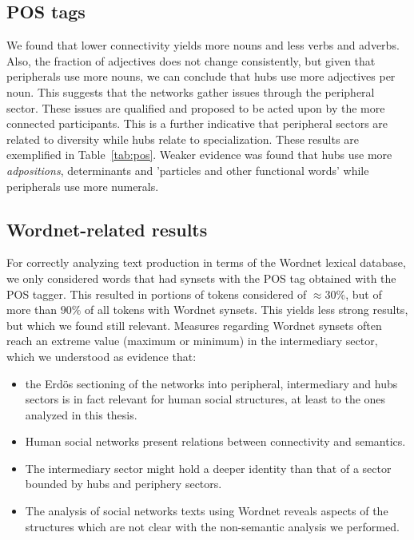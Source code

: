 
\subsection{POS tags}\label{subsec:pos}
We found that lower connectivity yields more nouns and less verbs and adverbs.
Also, the fraction of adjectives does not change consistently,
but given that peripherals use more nouns,
we can conclude that hubs use more adjectives per noun.
This suggests that the networks gather issues
through the peripheral sector. 
These issues are qualified and proposed to be acted upon
by the more connected participants.
This is a further indicative that peripheral sectors
are related to diversity while hubs relate to specialization.
These results are exemplified in Table~\ref{tab:pos}.
Weaker evidence was found that hubs use more \emph{adpositions},
determinants and 'particles and other functional words' while
peripherals use more numerals.

\FloatBarrier


\subsection{Wordnet-related results}
For correctly analyzing text production in terms of the Wordnet lexical database,
we only considered words that had synsets with the POS tag obtained with the POS tagger.
This resulted in portions of tokens considered of $\approx 30\%$,
but of more than $90\%$ of all tokens with Wordnet synsets.
This yields less strong results, but which we found still relevant.
Measures regarding Wordnet synsets often reach an extreme value (maximum or minimum)
in the intermediary sector, which we understood as evidence that:
\begin{itemize}
\item the Erd\"os sectioning of the networks into peripheral, intermediary and hubs sectors is in fact relevant for human social structures, at least to the ones analyzed in this thesis.
\item Human social networks present relations between connectivity and semantics.
\item The intermediary sector might hold a deeper identity than that of a sector bounded by hubs and periphery sectors.
\item The analysis of social networks texts using Wordnet reveals aspects of the structures which are not clear with the non-semantic analysis we performed.
\end{itemize}


